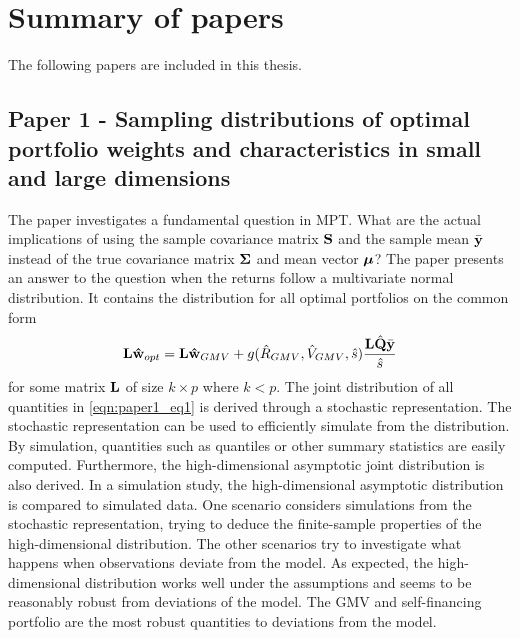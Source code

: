 \documentclass[12pt, oneside]{book}\usepackage{knitr}
\begin{document}
\chapter{Summary of papers}\label{ch:papersummary}


The following papers are included in this thesis.
\section{Paper 1 - Sampling distributions of optimal portfolio weights and characteristics in small and large dimensions}\label{sec:paper1}
The paper investigates a fundamental question in MPT. 
What are the actual implications of using the sample covariance matrix $\mathbf{S}$ and the sample mean $\bar{\mathbf{y}}$ instead of the true covariance matrix $\mathbf{\Sigma}$ and mean vector $\mbox{\boldmath$\mu$}$?
The paper presents an answer to the question when the returns follow a multivariate normal distribution. 
It contains the distribution for all optimal portfolios on the common form
\begin{equation}\label{eqn:paper1_eq1}
  \mathbf{L}\mathbf{\hat{w}}_{opt} = \mathbf{L}\mathbf{\hat{w}}_{GMV} + g(\hat{R}_{GMV}, \hat{V}_{GMV}, \hat{s})\frac{\mathbf{L}\hat{\mathbf{Q}}\bar{\mathbf{y}}}{\hat{s}}
\end{equation}
for some matrix $\mathbf{L}$ of size $k \times p$ where $k<p$.
The joint distribution of all quantities in \eqref{eqn:paper1_eq1} is derived through a stochastic representation. 
The stochastic representation can be used to efficiently simulate from the distribution.
By simulation, quantities such as quantiles or other summary statistics are easily computed.
Furthermore, the high-dimensional asymptotic joint distribution is also derived. 
In a simulation study, the high-dimensional asymptotic distribution is compared to simulated data.
One scenario considers simulations from the stochastic representation, trying to deduce the finite-sample properties of the high-dimensional distribution.
The other scenarios try to investigate what happens when observations deviate from the model.
As expected, the high-dimensional distribution works well under the assumptions and seems to be reasonably robust from deviations of the model.
The GMV and self-financing portfolio are the most robust quantities to deviations from the model.
\end{document}
